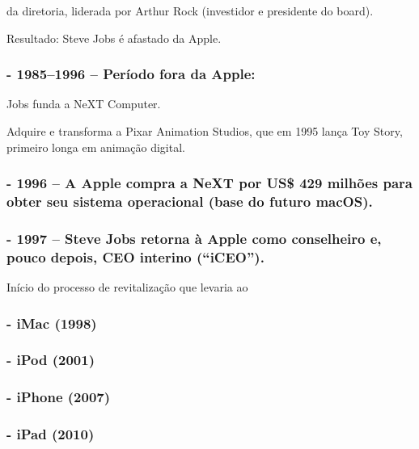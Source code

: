 \documentclass[
]{book}
\begin{document}
 da diretoria, liderada por Arthur Rock (investidor e presidente do board).

Resultado: Steve Jobs é afastado da Apple.

\subsubsection{- 1985--1996 -- Período fora da Apple:}\label{peruxedodo-fora-da-apple}

Jobs funda a NeXT Computer.

Adquire e transforma a Pixar Animation Studios, que em 1995 lança Toy Story, primeiro longa em animação digital.

\subsubsection{- 1996 -- A Apple compra a NeXT por US\$ 429 milhões para obter seu sistema operacional (base do futuro macOS).}\label{a-apple-compra-a-next-por-us-429-milhuxf5es-para-obter-seu-sistema-operacional-base-do-futuro-macos.}

\subsubsection{- 1997 -- Steve Jobs retorna à Apple como conselheiro e, pouco depois, CEO interino (``iCEO'').}\label{steve-jobs-retorna-uxe0-apple-como-conselheiro-e-pouco-depois-ceo-interino-iceo.}

Início do processo de revitalização que levaria ao

\subsubsection{- iMac (1998)}\label{imac-1998}

\subsubsection{- iPod (2001)}\label{ipod-2001}

\subsubsection{- iPhone (2007)}\label{iphone-2007}

\subsubsection{- iPad (2010)}\label{ipad-2010}
\end{document}
